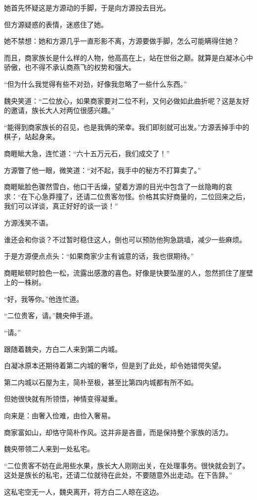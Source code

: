 \begin{this_body}
她首先怀疑这是方源动的手脚，于是向方源投去目光。

但方源疑惑的表情，迷惑住了她。

她不禁想：她和方源几乎一直形影不离，方源要做手脚，怎么可能瞒得住她？

而且，商家族长是什么样的人物，他高高在上，站在世俗之巅。就算是白凝冰心中骄傲，也不得不承认商燕飞的权势和强大。

“但为什么我觉得有些不对劲，好像我忽略了一些什么东西。”

魏央笑道：“二位放心，如果商家要对二位不利，又何必做如此曲折呢？这是友好的邀请，族长大人对两位很感兴趣。”

“能得到商家族长的召见，也是我俩的荣幸。我们即刻就可出发。”方源丢掉手中的棋子，站起身来。

商睚眦大急，连忙道：“六十五万元石，我们成交了！”

方源瞥了他一眼，微笑道：“对不起，我手中的秘方不打算卖了。”

商睚眦脸色骤然雪白，他口干舌燥，望着方源的目光中包含了一丝隐晦的哀求：“在下心急莽撞了，还请二位贵客勿怪。价格其实好商量的，二位回来之后，我们可以详谈，真正好好的谈一谈！”

方源浅笑不语。

谁还会和你谈？不过暂时稳住这人，倒也可以预防他狗急跳墙，减少一些麻烦。

于是方源便点点头：“如果商家少主有诚意的话，我也很期待。”

商睚眦顿时脸色一松，流露出感激的喜色。好像是快要坠崖的人，忽然抓住了崖壁上的一株树。

“好，我等你。”他连忙道。

“二位贵客，请。”魏央伸手道。

“请。”

跟随着魏央，方白二人来到第二内城。

白凝冰原本还期待着第二内城的奢华，但是到了此处，却令她错愕失望。

第二内城以石屋为主，简朴至极，甚至比第四内城都有所不如。

但她很快就有所领悟，神情变得凝重。

向来是：由奢入俭难，由俭入奢易。

商家富如山，却恪守简朴作风。这并非是吝啬，而是保持整个家族的活力。

魏央带领二人来到一处私宅。

“二位贵客不妨在此用些水果，族长大人刚刚出关，在处理事务。很快就会到了。这处是族长的私宅，还请二位就待在此处，不要随意外出走动。在下告辞。”

这私宅空无一人，魏央离开，将方白二人晾在这边。


\end{this_body}

